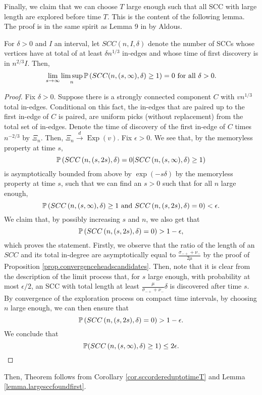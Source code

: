Finally, we claim that we can choose $T$ large enough such that all SCC with large length are explored before time $T$. This is the content of the following lemma. The proof is in the same spirit as Lemma 9 in \cite{Aldous1991} by Aldous. 
\begin{lemma}\label{lemma.largesccfoundfirst}
For $\delta>0$ and $I$ an interval, let $SCC(n,I,\delta)$ denote the number of SCCs whose vertices have at total of at least $\delta n^{1/3}$ in-edges and whose time of first discovery is in $n^{2/3}I$. Then,
$$\lim_{s\to \infty}\limsup_{n} \P\left(SCC(n,(s,\infty),\delta)\geq 1\right)=0\text{ for all }\delta>0.$$
\end{lemma}
\begin{proof}
Fix $\delta>0$. Suppose there is a strongly connected component $C$ with $vn^{1/3}$ total in-edges. Conditional on this fact, the in-edges that are paired up to the first in-edge of $C$ is paired, are uniform picks (without replacement) from the total set of in-edges. Denote the time of discovery of the first in-edge of $C$ times $n^{-2/3}$ by $\Xi_n$. Then, $\Xi_n\overset{d}{\to}\operatorname{Exp}(v)$. Fix $\epsilon>0$. We see that, by the memoryless property at time $s$,
$$\P\left(SCC\left(n,(s,2s),\delta\right)=0|SCC\left(n,(s,\infty),\delta\right)\geq 1\right)$$
is asymptotically bounded from above by 
$\exp(-s\delta)$ by the memoryless property at time $s$, such that we can find an $s>0$ such that for all $n$ large enough,
$$\P\left(SCC\left(n,(s,\infty),\delta\right)\geq 1 \text{ and }SCC\left(n,(s,2s),\delta\right)=0\right)<\epsilon.$$
We claim that, by possibly increasing $s$ and $n$, we also get that 
$$\P\left(SCC\left(n,(s,2s),\delta\right)=0\right)>1-\epsilon,$$
which proves the statement.
Firstly, we observe that the ratio of the length of an $SCC$ and its total in-degree are asymptotically equal to $\frac{\sigma_{-+}+\nu_-}{2\mu}$ by the proof of Proposition \ref{prop.convergenceheadscandidates}. Then, note that it is clear from the description of the limit process that, for $s$ large enough, with probability at most $\epsilon/2$, an SCC with total length at least $\frac{\mu}{\sigma_{-+}+\nu_-}\delta$ is discovered after time $s$. By convergence of the exploration process on compact time intervals, by choosing $n$ large enough, we can then ensure that 
$$\P\left(SCC\left(n,(s,2s),\delta\right)=0\right)>1-\epsilon.$$
We conclude that 
$$\P(SCC\left(n,(s,\infty),\delta\right)\geq 1)\leq 2\epsilon.$$
\end{proof}

Then, Theorem  follows from Corollary \ref{cor.sccordereduptotimeT} and Lemma \ref{lemma.largesccfoundfirst}. 

